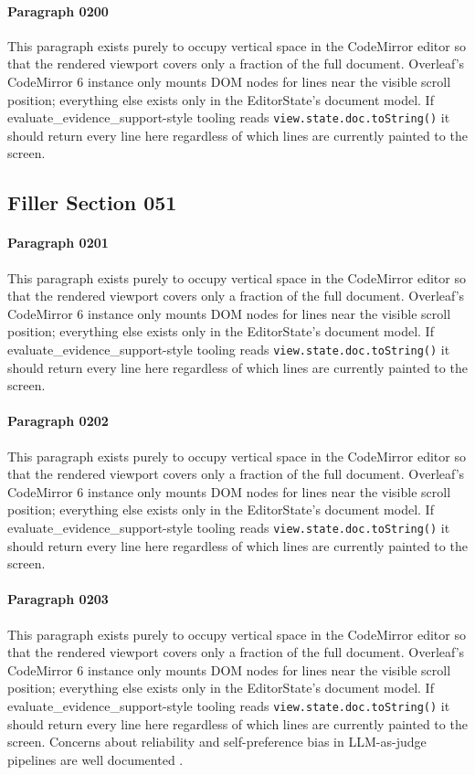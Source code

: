 \documentclass{article}
\begin{document}
\paragraph{Paragraph 0200}
This paragraph exists purely to occupy vertical space in the CodeMirror editor so that the rendered viewport covers only a fraction of the full document. Overleaf's CodeMirror 6 instance only mounts DOM nodes for lines near the visible scroll position; everything else exists only in the EditorState's document model. If evaluate\_evidence\_support-style tooling reads \texttt{view.state.doc.toString()} it should return every line here regardless of which lines are currently painted to the screen.

\subsection{Filler Section 051}
\paragraph{Paragraph 0201}
This paragraph exists purely to occupy vertical space in the CodeMirror editor so that the rendered viewport covers only a fraction of the full document. Overleaf's CodeMirror 6 instance only mounts DOM nodes for lines near the visible scroll position; everything else exists only in the EditorState's document model. If evaluate\_evidence\_support-style tooling reads \texttt{view.state.doc.toString()} it should return every line here regardless of which lines are currently painted to the screen.

\paragraph{Paragraph 0202}
This paragraph exists purely to occupy vertical space in the CodeMirror editor so that the rendered viewport covers only a fraction of the full document. Overleaf's CodeMirror 6 instance only mounts DOM nodes for lines near the visible scroll position; everything else exists only in the EditorState's document model. If evaluate\_evidence\_support-style tooling reads \texttt{view.state.doc.toString()} it should return every line here regardless of which lines are currently painted to the screen.

\paragraph{Paragraph 0203}
This paragraph exists purely to occupy vertical space in the CodeMirror editor so that the rendered viewport covers only a fraction of the full document. Overleaf's CodeMirror 6 instance only mounts DOM nodes for lines near the visible scroll position; everything else exists only in the EditorState's document model. If evaluate\_evidence\_support-style tooling reads \texttt{view.state.doc.toString()} it should return every line here regardless of which lines are currently painted to the screen. Concerns about reliability and self-preference bias in LLM-as-judge pipelines are well documented \citep{lindqvist2021judge}.
\end{document}
